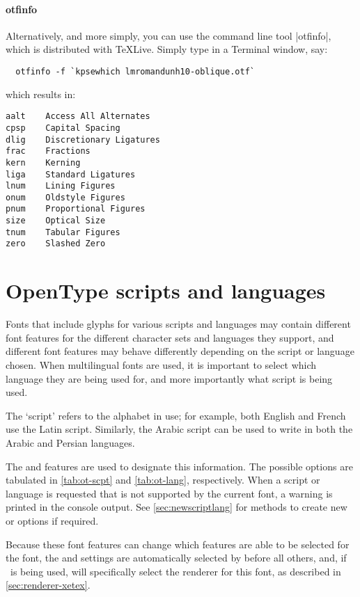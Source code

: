\documentclass[a4paper]{l3doc}
\begin{document}
\paragraph{otfinfo}
Alternatively, and more simply, you can use the command line tool |otfinfo|, which is distributed with \TeX{}Live.
Simply type in a Terminal window, say:
\begin{Verbatim}
  otfinfo -f `kpsewhich lmromandunh10-oblique.otf`
\end{Verbatim}
which results in:
\begin{Verbatim}[frame=single]
aalt	Access All Alternates
cpsp	Capital Spacing
dlig	Discretionary Ligatures
frac	Fractions
kern	Kerning
liga	Standard Ligatures
lnum	Lining Figures
onum	Oldstyle Figures
pnum	Proportional Figures
size	Optical Size
tnum	Tabular Figures
zero	Slashed Zero
\end{Verbatim}


\section{OpenType scripts and languages}\label{sec:ot}

Fonts that include glyphs for various scripts and languages may contain different font features for the different character sets and languages they support, and different font features may behave differently depending on the script or language chosen.
When multilingual fonts are used, it is important to select which language
they are being used for, and more importantly what script is being used.

The `script' refers to the alphabet in use; for example, both English
and French use the Latin script. Similarly, the Arabic script can be used
to write in both the Arabic and Persian languages.

The
 and  features are used to designate this information. The possible options are
tabulated in \vref{tab:ot-scpt} and \vref{tab:ot-lang},
respectively. When a script or language is requested that is not
supported by the current font, a warning is printed in the console output.
See \vref{sec:newscriptlang} for methods to create new  or 
options if required.

Because these font features can
change which features are able to be selected for the font, the  and 
settings are automatically selected
by  before all others, and, if \XeTeX\ is being used, will
specifically select the 
renderer for this font, as described in \vref{sec:renderer-xetex}.
\end{document}
